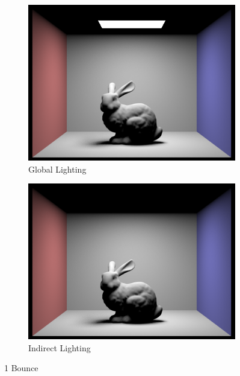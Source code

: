 \documentclass{article}
\begin{document}
\begin{figure}[htb!]
\begin{subfigure}[h]{0.4\textwidth}
\includegraphics[width=\textwidth]{task4/CBbunny_global_1024_1.png}
\caption{Global Lighting}
\end{subfigure}
\hfill\vrule\hfill
\begin{subfigure}[h]{0.4\textwidth}
\includegraphics[width=\textwidth]{task4/CBbunny_indirect_1024_1.png}
\caption{Indirect Lighting}
\end{subfigure}%

\caption[f2]{1 Bounce}
\end{figure}
\end{document}
